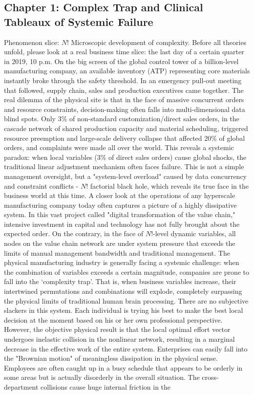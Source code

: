 \documentclass[11pt,a4paper]{article}
\begin{document}
\subsection*{Chapter 1: Complex Trap and Clinical Tableaux of Systemic Failure}
Phenomenon slice: $N!$ Microscopic development of complexity. Before all theories unfold, please look at a real business time slice: the last day of a certain quarter in 2019, 10 p.m. On the big screen of the global control tower of a billion-level manufacturing company, an available inventory (ATP) representing core materials instantly broke through the safety threshold. In an emergency pull-out meeting that followed, supply chain, sales and production executives came together. The real dilemma of the physical site is that in the face of massive concurrent orders and resource constraints, decision-making often falls into multi-dimensional data blind spots. Only 3\% of non-standard customization/direct sales orders, in the cascade network of shared production capacity and material scheduling, triggered resource preemption and large-scale delivery collapse that affected 20\% of global orders, and complaints were made all over the world. This reveals a systemic paradox: when local variables (3\% of direct sales orders) cause global shocks, the traditional linear adjustment mechanism often faces failure. This is not a simple management oversight, but a "system-level overload" caused by data concurrency and constraint conflicts - $N!$ factorial black hole, which reveals its true face in the business world at this time. A closer look at the operations of any hyperscale manufacturing company today often captures a picture of a highly dissipative system. In this vast project called "digital transformation of the value chain," intensive investment in capital and technology has not fully brought about the expected order. On the contrary, in the face of $N!$-level dynamic variables, all nodes on the value chain network are under system pressure that exceeds the limits of manual management bandwidth and traditional management. The physical manufacturing industry is generally facing a systemic challenge: when the combination of variables exceeds a certain magnitude, companies are prone to fall into the ‘complexity trap’. That is, when business variables increase, their intertwined permutations and combinations will explode, completely surpassing the physical limits of traditional human brain processing. There are no subjective slackers in this system. Each individual is trying his best to make the best local decision at the moment based on his or her own professional perspective. However, the objective physical result is that the local optimal effort vector undergoes inelastic collision in the nonlinear network, resulting in a marginal decrease in the effective work of the entire system. Enterprises can easily fall into the "Brownian motion" of meaningless dissipation in the physical sense. Employees are often caught up in a busy schedule that appears to be orderly in some areas but is actually disorderly in the overall situation. The cross-department collisions cause huge internal friction in the 
\end{document}
